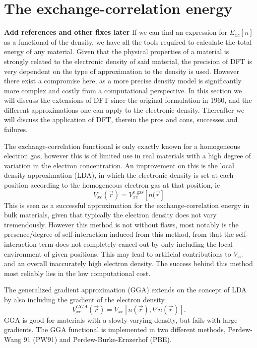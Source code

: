 \section{The exchange-correlation energy}
\textbf{Add references and other fixes later}
If we can find an expression for $E_{xc}[n]$ as a functional of the density, we have all the tools required to calculate the total energy of any material. Given that the physical properties of a material is strongly related to the electronic density of said material, the precision of DFT is very dependent on the type of approximation to the density is used. However there exist a compromise here, as a more precise density model is significantly more complex and costly from a computational perspective. In this section we will discuss the extensions of DFT since the original formulation in 1960, and the different approximations one can apply to the electronic density. Thereafter we will discuss the application of DFT, therein the pros and cons, successes and failures.


The exchange-correlation functional is only exactly known for a homogeneous electron gas, however this is of limited use in real materials with a high degree of variation in the electron concentration. An improvement on this is the local density approximation (LDA), in which the electronic density is set at each position according to the homogeneous electron gas at that position, ie
\begin{equation}
    V_{xc}(\vec{r}) = V_{xc}^{\text{e gas}}[n(\vec{r}]
\end{equation}
This is seen as a successful approximation for the exchange-correlation energy in bulk materials, given that typically the electron density does not vary tremendously. However this method is not without flaws, most notably is the presence/degree of self-interaction induced from this method, from that the self-interaction term does not completely cancel out by only including the local environment of given positions. This may lead to artificial contributions to $V_{xc}$ and an overall inaccurately high electron density. The success behind this method most reliably lies in the low computational cost. 

The generalized gradient approximation (GGA) extends on the concept of LDA by also including the gradient of the electron density. 
\begin{equation}
    V_{xc}^{GGA}(\vec{r}) = V_{xc}[n(\vec{r}), \nabla n(\vec{r})].
\end{equation}
GGA is good for materials with a slowly varying density, but fails with large gradients. The GGA functional is implemented in two different methods, Perdew-Wang 91 (PW91) and Perdew-Burke-Ernzerhof (PBE). 

